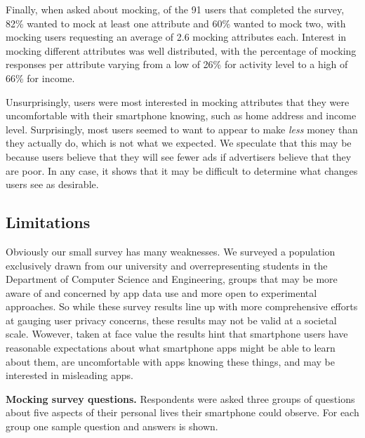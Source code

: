 Finally, when asked about mocking, of the 91 users that completed the survey,
82\% wanted to mock at least one attribute and 60\% wanted to mock two, with
mocking users requesting an average of 2.6 mocking attributes each. Interest
in mocking different attributes was well distributed, with the percentage of
mocking responses per attribute varying from a low of 26\% for activity level
to a high of 66\% for income.

Unsurprisingly, users were most interested in mocking attributes that they
were uncomfortable with their smartphone knowing, such as home address and
income level. Surprisingly, most users seemed to want to appear to make
\textit{less} money than they actually do, which is not what we expected. We
speculate that this may be because users believe that they will see fewer ads
if advertisers believe that they are poor. In any case, it shows that it may
be difficult to determine what changes users see as desirable.

\subsection{Limitations}

Obviously our small survey has many weaknesses. We surveyed a population
exclusively drawn from our university and overrepresenting students in the
Department of Computer Science and Engineering, groups that may be more aware
of and concerned by app data use and more open to experimental approaches. So
while these survey results line up with more comprehensive efforts at gauging
user privacy concerns, these results may not be valid at a societal scale.
Wowever, taken at face value the results hint that smartphone users have
reasonable expectations about what smartphone apps might be able to learn
about them, are uncomfortable with apps knowing these things, and may be
interested in misleading apps.

\begin{table}[t]



\caption{\textbf{Mocking survey questions.} Respondents were asked three
groups of questions about five aspects of their personal lives their
smartphone could observe. For each group one sample question and answers is
shown.}

  \label{table-surveyquestions}
\end{table}
